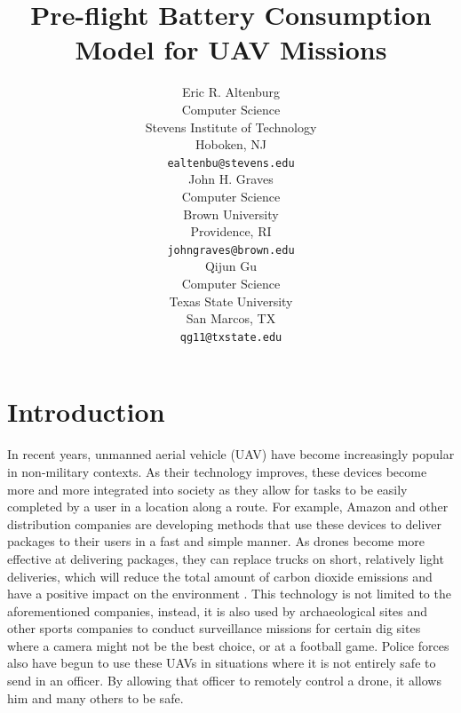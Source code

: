 \documentclass{article}
\title{Pre-flight Battery Consumption Model for UAV Missions}
\author{
  Eric R. Altenburg\\
  Computer Science\\
  Stevens Institute of Technology\\
  Hoboken, NJ \\
  \texttt{ealtenbu@stevens.edu}\\
   \And
  John H. Graves\\
  Computer Science\\
  Brown University\\
  Providence, RI \\
  \texttt{john\textunderscore graves@brown.edu} \\
  \And
  Qijun Gu\\
  Computer Science\\
  Texas State University\\
  San Marcos, TX \\
  \texttt{qg11@txstate.edu}\\
}
\begin{document}
\maketitle


\begin{abstract}
\lipsum[1]
\end{abstract}




\section{Introduction}
In recent years, unmanned aerial vehicle (UAV) have become increasingly popular in non-military contexts. As their technology improves, these devices become more and more integrated into society as they allow for tasks to be easily completed by a user in a location along a route. For example, Amazon and other distribution companies are developing methods that use these devices to deliver packages to their users in a fast and simple manner. As drones become more effective at delivering packages, they can replace trucks on short, relatively light deliveries, which will reduce the total amount of carbon dioxide emissions and have a positive impact on the environment \cite{Goodchild}. This technology is not limited to the aforementioned companies, instead, it is also used by archaeological sites and other sports companies to conduct surveillance missions for certain dig sites where a camera might not be the best choice, or at a football game. Police forces also have begun to use these UAVs in situations where it is not entirely safe to send in an officer. By allowing that officer to remotely control a drone, it allows him and many others to be safe.\par
\end{document}
